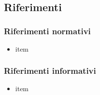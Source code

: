 \subsection{Riferimenti}

\subsubsection{Riferimenti normativi}
\begin{itemize}
	\item item
\end{itemize}

\subsubsection{Riferimenti informativi}
\begin{itemize}
	\item item
\end{itemize}